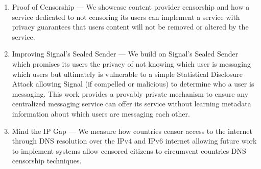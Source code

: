 \begin{enumerate}
    \item Proof of Censorship --- We showcase content provider censorship and
    how a service dedicated to not censoring its users can implement a service
    with privacy guarantees that users content will not be removed or altered by
    the service.
    \item Improving Signal's Sealed Sender --- We build on Signal's Sealed
    Sender which promises its users the privacy of not knowing which user is
    messaging which users but ultimately is vulnerable to a simple Statistical
    Disclosure Attack allowing Signal (if compelled or malicious) to determine
    who a user is messaging. This work provides a provably private mechanism to
    ensure any centralized messaging service can offer its service without
    learning metadata information about which users are messaging each other.
    \item Mind the IP Gap --- We measure how countries censor access to the
    internet through DNS resolution over the IPv4 and IPv6 internet allowing
    future work to implement systems allow censored citizens to circumvent
    countries DNS censorship techniques.
\end{enumerate}